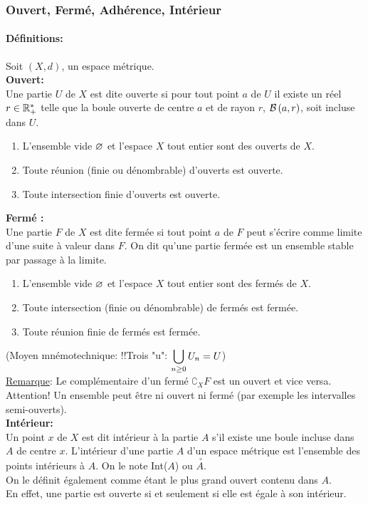 \documentclass[12pt,a4paper]{article}
\begin{document}
	\subsubsection{Ouvert, Fermé, Adhérence, Intérieur}
	\paragraph{Définitions:}
	Soit $\left(X,d\right)$, un espace métrique.\\
	\textbf{Ouvert:}\\Une partie $U$ de $X$ est dite ouverte si pour tout point $a$ de $U$ il existe un réel $r\in \mathbb{R}^*_+$ telle que la boule ouverte de centre $a$ et de rayon $r$, $\mathcal{B}\left({a},{r}\right)$, soit incluse dans $U$.
	\begin{enumerate}
		\item L'ensemble vide $\varnothing$ et l'espace $X$ tout entier sont des ouverts de $X$.
		\item Toute réunion (finie ou dénombrable) d'ouverts est ouverte.
		\item Toute intersection finie d'ouverts est ouverte.
	\end{enumerate}
	
	
	\textbf{Fermé :}\\
	Une partie $F$ de $X$ est dite fermée si tout point $a$ de $F$ peut s'écrire comme limite d'une suite à valeur dans $F$.
	On dit qu'une partie fermée est un ensemble stable par passage à la limite.
	\begin{enumerate}
		\item L'ensemble vide $\varnothing$ et l'espace $X$ tout entier sont des fermés de $X$.
		\item Toute intersection (finie ou dénombrable) de fermés est fermée.
		\item Toute réunion finie de fermés est fermée.
	\end{enumerate}
	(Moyen mnémotechnique: !!Trois "u": $\displaystyle\bigcup\limits_{n\geq 0} U_n= U$)\\
	\underline{Remarque}:
	Le complémentaire d'un fermé $\complement_X F$ est un ouvert et vice versa.\\
	Attention! Un ensemble peut être ni ouvert ni fermé (par exemple les intervalles semi-ouverts).\\ 
	
	\textbf{Intérieur:}\\
	Un point $x$ de $X$ est dit intérieur à la partie $A$ s'il existe une boule incluse dans $A$ de centre $x$.
	L'intérieur d'une partie $A$ d'un espace métrique est l'ensemble des points intérieurs à $A$. On le note Int($A$) ou $\overset{\;\circ}{A}$.\\
	On le définit également comme étant le plus grand ouvert contenu dans $A$.\\
	En effet, une partie est ouverte si et seulement si elle est égale à son intérieur.\\
	
\end{document}
